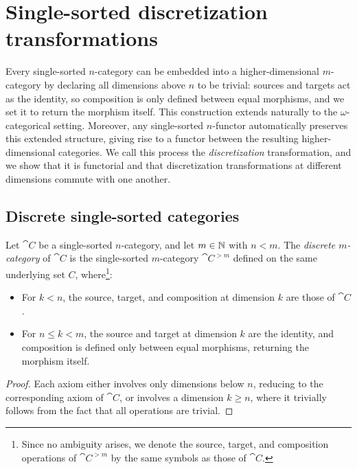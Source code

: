 \chapter{Single-sorted discretization transformations}
\label{ss_discrete}

Every single-sorted $n$-category can be embedded into a higher-dimensional $m$-category by declaring
all dimensions above $n$ to be trivial: sources and targets act as the identity, so composition is
only defined between equal morphisms, and we set it to return the morphism itself. This construction
extends naturally to the $\omega$-categorical setting. Moreover, any single-sorted $n$-functor
automatically preserves this extended structure, giving rise to a functor between the resulting
higher-dimensional categories. We call this process the \emph{discretization} transformation, and we
show that it is functorial and that discretization transformations at different dimensions commute
with one another.

\section{Discrete single-sorted categories}

\begin{construction}
  \label{def:SingleSortedNCategory_discrete}
  \leanok
  Let $\cat{C}$ be a single-sorted $n$-category, and let $m \in \mathbb{N}$ with $n < m$. The
  \emph{discrete $m$-category} of $\cat{C}$ is the single-sorted $m$-category $\cat{C}^{>m}$ defined
  on the same underlying set $C$, where\footnote{Since no ambiguity arises, we denote the source,
  target, and composition operations of $\cat{C}^{>m}$ by the same symbols as those of $\cat{C}$.}:

  \begin{itemize}
    \item For $k < n$, the source, target, and composition at dimension $k$ are those of $\cat{C}$.
    \item For $n \leq k < m$, the source and target at dimension $k$ are the identity, and
      composition is defined only between equal morphisms, returning the morphism itself.
  \end{itemize}
\end{construction}

\begin{proof}
  \leanok
  Each axiom either involves only dimensions below $n$, reducing to the corresponding axiom of
  $\cat{C}$, or involves a dimension $k \geq n$, where it trivially follows from the fact that all
  operations are trivial.
\end{proof}

